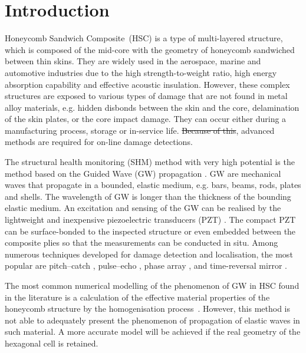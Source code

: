 \documentclass[materials,article,submit,moreauthors,pdftex]{Definitions/mdpi}
\providecommand{\DIFadd}[1]{{\protect\color{blue}{#1}}} %
\providecommand{\DIFdel}[1]{{\protect\color{red}\sout{#1}}}                      %
\providecommand{\DIFaddbegin}{} %
\providecommand{\DIFaddend}{} %
\providecommand{\DIFdelbegin}{} %
\providecommand{\DIFdelend}{} %
\begin{document}
\section{Introduction}
\label{sec:intro}
Honeycomb Sandwich Composite~(HSC) is a type of multi-layered structure, which is composed of the mid-core with the geometry of honeycomb sandwiched between thin skins.
They are widely used in the aerospace, marine and automotive industries due to the high strength-to-weight ratio, high energy absorption capability and effective acoustic insulation.
However, these complex structures are exposed to various types of damage that are not found in metal alloy materials, e.g. hidden disbonds between the skin and the core, delamination of the skin plates, or the core impact damage.
They can occur either during a manufacturing process, storage or in-service life.
\DIFdelbegin \DIFdel{Because of this}\DIFdelend \DIFaddbegin \DIFadd{Therefore}\DIFaddend , advanced methods are required for on-line damage detections.

The structural health monitoring (SHM) method with very high potential is the method based on the Guided Wave (GW) propagation \cite{mustapha2011assessment, sikdar2016guided, sikdar2016ultrasonic,radzienski2016assessment, yu2019core}.
GW are mechanical waves that propagate in a bounded, elastic medium, e.g. bars, beams, rods, plates and shells.
The wavelength of GW is longer than the thickness of the bounding elastic medium.
An excitation and sensing of the GW can be realised by the lightweight and inexpensive piezoelectric transducers (PZT) \cite{giurgiutiumicromechatronics}.
The compact PZT can be surface-bonded to the inspected structure or even embedded between the composite plies so that the measurements can be conducted in situ.
Among numerous techniques developed for damage detection and localisation, the most popular are pitch--catch \cite{ihn2008pitch, sikdar2017structural}, pulse--echo \cite{guo1993interaction, kudela2008damage}, phase array \cite{lu2006crack, ostachowicz2008elastic}, and time-reversal mirror \cite{fink1992time, eremin2016analytically}.

The most common numerical modelling of the phenomenon of GW in HSC found in the literature is a calculation of the effective material properties of the honeycomb structure by the homogenisation process~\cite{shi1995derivation, qi2008ultrasonic, mustapha2014leaky, baid2015dispersion, sikdar2016guided}.
However, this method is not able to adequately present the phenomenon of propagation of elastic waves in such material.
A more accurate model will be achieved if the real geometry of the hexagonal cell is retained.
\end{document}
